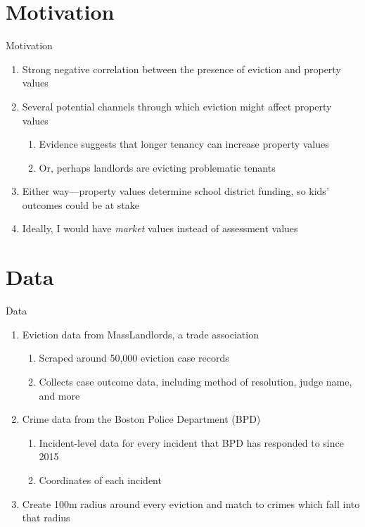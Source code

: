 \documentclass [xcolor=svgnames, t] {beamer}
\begin{document}
\section{Motivation}


\begin{frame}{Motivation}
\begin{enumerate}
    \item Strong negative correlation between the presence of eviction and property values
    \item Several potential channels through which eviction might affect property values
    \begin{enumerate}
        \item Evidence suggests that longer tenancy can increase property values
        \item Or, perhaps landlords are evicting problematic tenants
    \end{enumerate}
    \item Either way—property values determine school district 
    funding, so kids' outcomes could be at stake
    \item Ideally, I would have \emph{market} values instead of assessment values
\end{enumerate}
\end{frame}

\section{Data}
\begin{frame}{Data}
    \begin{enumerate}
        \item Eviction data from MassLandlords, a trade association
        \begin{enumerate}
            \item Scraped around 50,000 eviction case records
            \item Collects case outcome data, including method of resolution, judge name, and more
        \end{enumerate}
        \item Crime data from the Boston Police Department (BPD)
        \begin{enumerate}
            \item Incident-level data for every incident that BPD has responded to since 2015
            \item Coordinates of each incident
        \end{enumerate}
        \item Create 100m radius around every eviction and match to crimes which fall into that radius
    \end{enumerate}
\end{frame}
\end{document}
